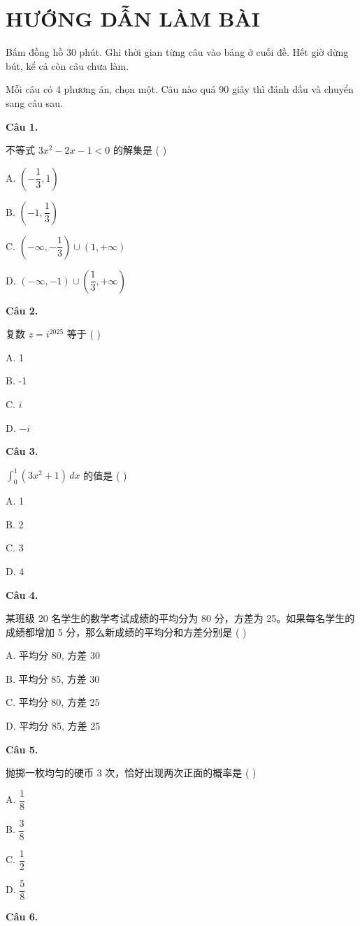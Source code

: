 \documentclass[11pt, a4paper]{article}
\begin{document}

\section{HƯỚNG DẪN LÀM BÀI}

Bấm đồng hồ 30 phút. Ghi thời gian từng câu vào bảng ở cuối đề. Hết giờ dừng bút, kể cả còn câu chưa làm.

Mỗi câu có 4 phương án, chọn một. Câu nào quá 90 giây thì đánh dấu và chuyển sang câu sau.

\textbf{Câu 1.}

不等式 $3x^2 - 2x - 1 < 0$ 的解集是 ( )

A. $\left(-\dfrac{1}{3}, 1\right)$

B. $\left(-1, \dfrac{1}{3}\right)$

C. $(-\infty, -\dfrac{1}{3}) \cup (1, +\infty)$

D. $(-\infty, -1) \cup \left(\dfrac{1}{3}, +\infty\right)$

\textbf{Câu 2.}

复数 $z = i^{2025}$ 等于 ( )

A. 1

B. -1

C. $i$

D. $-i$

\textbf{Câu 3.}

$\int_0^1 (3x^2 + 1)\,dx$ 的值是 ( )

A. 1

B. 2

C. 3

D. 4

\textbf{Câu 4.}

某班级 20 名学生的数学考试成绩的平均分为 80 分，方差为 25。如果每名学生的成绩都增加 5 分，那么新成绩的平均分和方差分别是 ( )

A. 平均分 80, 方差 30

B. 平均分 85, 方差 30

C. 平均分 80, 方差 25

D. 平均分 85, 方差 25

\textbf{Câu 5.}

抛掷一枚均匀的硬币 3 次，恰好出现两次正面的概率是 ( )

A. $\dfrac{1}{8}$

B. $\dfrac{3}{8}$

C. $\dfrac{1}{2}$

D. $\dfrac{5}{8}$

\textbf{Câu 6.}
\end{document}
